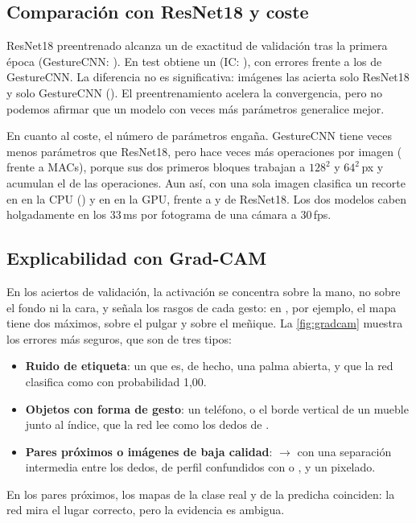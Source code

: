 \subsection{Comparación con ResNet18 y coste}
\label{sec:resnet}

ResNet18 preentrenado alcanza un \AccepocaunoResnet{} de exactitud de validación tras la primera
época (GestureCNN: \AccepocaunoFinal). En test obtiene un \AccTestResnet{} (IC:
\AccTestResnetIC), con \ErroresTestResnet{} errores frente a los \ErroresTestFinal{} de
GestureCNN. La diferencia no es significativa: \SolovarianteResnet{} imágenes las acierta solo
ResNet18 y \SolofinalResnet{} solo GestureCNN (\PmcnemarFinalResnet). El preentrenamiento acelera
la convergencia, pero no podemos afirmar que un modelo con \RatioParams{} veces más parámetros
generalice mejor.

En cuanto al coste, el número de parámetros engaña. GestureCNN tiene \RatioParams{} veces menos
parámetros que ResNet18, pero hace \RatioMacs{} veces más operaciones por imagen (\MacsFinal{}
frente a \MacsResnet{} MACs), porque sus dos primeros bloques trabajan a $128^2$ y $64^2$\,px y
acumulan el \FracMacsPrimerosBloques{} de las operaciones. Aun así, con una sola imagen clasifica
un recorte en \LatCpuFinal{} en la CPU (\CPU) y en \LatCudaFinal{} en la GPU, frente a
\LatCpuResnet{} y \LatCudaResnet{} de ResNet18. Los dos modelos caben holgadamente en los 33\,ms
por fotograma de una cámara a 30\,fps.

\subsection{Explicabilidad con Grad-CAM}
\label{sec:gradcam}

En los aciertos de validación, la activación se concentra sobre la mano, no sobre el fondo ni la
cara, y señala los rasgos de cada gesto: en , por ejemplo, el mapa tiene dos máximos,
sobre el pulgar y sobre el meñique. La \cref{fig:gradcam} muestra los errores más seguros, que son
de tres tipos:
\begin{itemize}
  \item \textbf{Ruido de etiqueta}: un  que es, de hecho, una palma abierta, y
    que la red clasifica como  con probabilidad 1,00.
  \item \textbf{Objetos con forma de gesto}: un teléfono, o el borde vertical de un mueble junto
    al índice, que la red lee como los dedos de .
  \item \textbf{Pares próximos o imágenes de baja calidad}: $\to$ con una
    separación intermedia entre los dedos,  de perfil confundidos con  o
    , y un  pixelado.
\end{itemize}
En los pares próximos, los mapas de la clase real y de la predicha coinciden: la red mira el lugar
correcto, pero la evidencia es ambigua.

